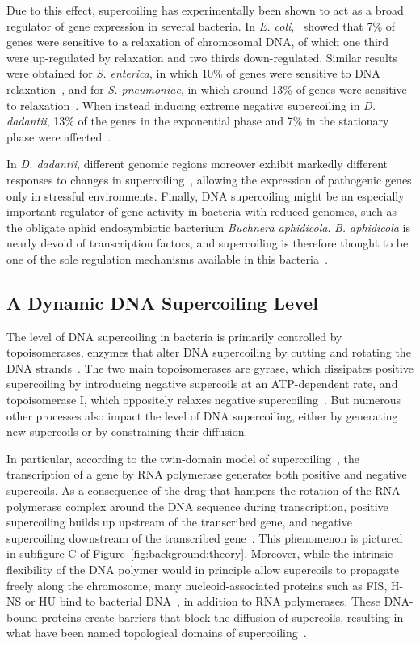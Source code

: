 Due to this effect, supercoiling has experimentally been shown to act as a broad regulator of gene expression in several bacteria.
In \emph{E. coli},~\cite{peter2004} showed that 7\% of genes were sensitive to a relaxation of chromosomal DNA, of which one third were up-regulated by relaxation and two thirds down-regulated.
Similar results were obtained for \emph{S. enterica}, in which 10\% of genes were sensitive to DNA relaxation~\citep{webber2013}, and for \emph{S. pneumoniae}, in which around 13\% of genes were sensitive to relaxation~\citep{ferrandiz2010}.
When instead inducing extreme negative supercoiling in \emph{D. dadantii}, 13\% of the genes in the exponential phase and 7\% in the stationary phase were affected~\citep{pineau2022a}.

In \emph{D. dadantii}, different genomic regions moreover exhibit markedly different responses to changes in supercoiling~\citep{muskhelishvili2019}, allowing the expression of pathogenic genes only in stressful environments.
Finally, DNA supercoiling might be an especially important regulator of gene activity in bacteria with reduced genomes, such as the obligate aphid endosymbiotic bacterium \emph{Buchnera aphidicola}.
\emph{B. aphidicola} is nearly devoid of transcription factors, and supercoiling is therefore thought to be one of the sole regulation mechanisms available in this bacteria~\citep{brinza2013}.

\subsection{A Dynamic DNA Supercoiling Level}

The level of DNA supercoiling in bacteria is primarily controlled by topoisomerases, enzymes that alter DNA supercoiling by cutting and rotating the DNA strands~\citep{duprey2021}.
The two main topoisomerases are gyrase, which dissipates positive supercoiling by introducing negative supercoils at an ATP-dependent rate, and topoisomerase I, which oppositely relaxes negative supercoiling~\citep{martisb.2019}.
But numerous other processes also impact the level of DNA supercoiling, either by generating new supercoils or by constraining their diffusion.

In particular, according to the twin-domain model of supercoiling~\citep{liu1987}, the transcription of a gene by RNA polymerase generates both positive and negative supercoils.
As a consequence of the drag that hampers the rotation of the RNA polymerase complex around the DNA sequence during transcription, positive supercoiling builds up upstream of the transcribed gene, and negative supercoiling downstream of the transcribed gene~\citep{visser2022}.
This phenomenon is pictured in subfigure C of Figure~\ref{fig:background:theory}.
Moreover, while the intrinsic flexibility of the DNA polymer would in principle allow supercoils to propagate freely along the chromosome, many nucleoid-associated proteins such as FIS, H-NS or HU bind to bacterial DNA~\citep{krogh2018}, in addition to RNA polymerases.
These DNA-bound proteins create barriers that block the diffusion of supercoils, resulting in what have been named topological domains of supercoiling~\citep{postow2004}.

